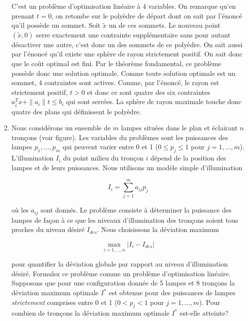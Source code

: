\begin{enumerate}
\begin{solution}
      C'est un problème d'optimisation linéaire à 4 variables.
      On remarque qu'en prenant $t = 0$, on retombe sur le polyèdre
      de départ dont on sait par l'énoncé qu'il possède un sommet.
      Soit $\tilde{x}$ un de ces sommets.
      Le nouveau point $(\tilde{x}, 0)$ serre exactement une contrainte
      supplémentaire sans pour autant désactiver une autre, 
      c'est donc un des sommets de ce polyèdre.
      On sait aussi par l'énoncé qu'il existe
      une sphère de rayon strictement positif.
      On sait donc que le coût optimal est fini.
      Par le théorème fondamental,
      ce problème possède donc une solution optimale.
      Comme toute solution optimale est un sommet,
      4 contraintes sont actives.
      Comme, par l'énoncé, le rayon est strictement positif,
      $t > 0$ et donc ce sont quatre des six contraintes
      $a_i^Tx + \|a_i\|t \leq b_i$ qui sont serrées.
      La sphère de rayon maximale touche donc quatre des
      plans qui définissent le polyèdre.
    \end{solution}

  \item Nous considérons un ensemble de $m$ lampes situées dans le  plan et éclairant $n$
    tronçons (voir figure).  Les variables du problèmes sont les puissances des lampes $p_1, \ldots, p_m$ qui peuvent varier entre 0 et 1 ($0 \leq p_j \leq 1$ pour
    $j=1, \ldots, m$).  L'illumination $I_i$ du point milieu du tronçon $i$ dépend de la position des lampes et de leurs
    puissances. Nous utilisons un modèle simple d'illumination

    $$I_i = \sum_{j=1}^m a_{ij} p_j$$

    où les $a_{ij}$ sont donnés. Le problème consiste à déterminer la puissance des lampes de façon à ce que les niveaux d'illumination des
    tronçons soient tous proches du niveau désiré $I_{des}$. Nous choisissons la déviation maximum

    $$\max_{i=1, \ldots, n} | I_i -I_{des}|$$

    pour quantifier la déviation globale par rapport au niveau d'illumination désiré.  Formulez ce problème comme un problème d'optimisation linéaire. Supposons
    que pour une configuration donnée de 5 lampes et 8 tronçons la déviation maximum optimale  $I^*$ est obtenue pour des puissances de lampes {\it
    strictement}  comprises entre 0 et 1 ($0 < p_j < 1$ pour $j=1, \ldots, m$). Pour combien de tronçons la déviation maximum optimale $I^*$ est-elle atteinte?






\end{enumerate}
